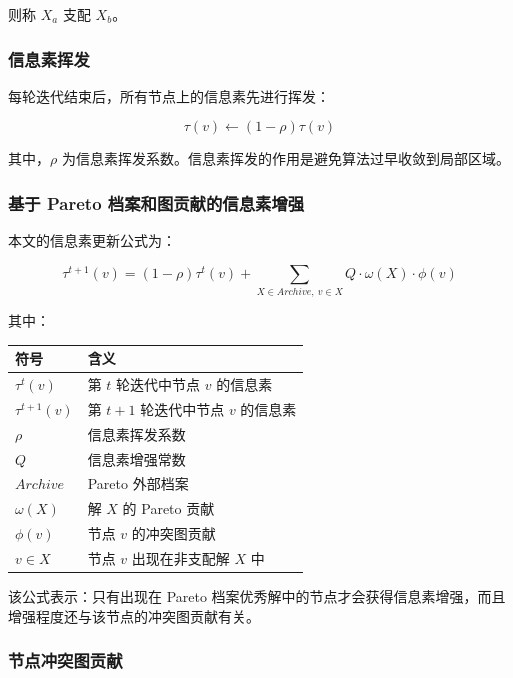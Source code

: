\documentclass[UTF8,a4paper,12pt]{ctexart}
\begin{document}
则称 $X_a$ 支配 $X_b$。

\subsubsection{信息素挥发}

每轮迭代结束后，所有节点上的信息素先进行挥发：

\begin{equation}
\tau(v)\leftarrow (1-\rho)\tau(v)
\end{equation}

其中，$\rho$ 为信息素挥发系数。信息素挥发的作用是避免算法过早收敛到局部区域。

\subsubsection{基于 Pareto 档案和图贡献的信息素增强}

本文的信息素更新公式为：

\begin{equation}
\tau^{t+1}(v)
=
(1-\rho)\tau^t(v)
+
\sum_{X\in Archive,\ v\in X}
Q\cdot \omega(X)\cdot \phi(v)
\end{equation}

其中：

\begin{center}
\begin{tabular}{ll}
\toprule
符号 & 含义 \\
\midrule
$\tau^{t}(v)$ & 第 $t$ 轮迭代中节点 $v$ 的信息素 \\
$\tau^{t+1}(v)$ & 第 $t+1$ 轮迭代中节点 $v$ 的信息素 \\
$\rho$ & 信息素挥发系数 \\
$Q$ & 信息素增强常数 \\
$Archive$ & Pareto 外部档案 \\
$\omega(X)$ & 解 $X$ 的 Pareto 贡献 \\
$\phi(v)$ & 节点 $v$ 的冲突图贡献 \\
$v\in X$ & 节点 $v$ 出现在非支配解 $X$ 中 \\
\bottomrule
\end{tabular}
\end{center}

该公式表示：只有出现在 Pareto 档案优秀解中的节点才会获得信息素增强，而且增强程度还与该节点的冲突图贡献有关。

\subsubsection{节点冲突图贡献}
\end{document}
